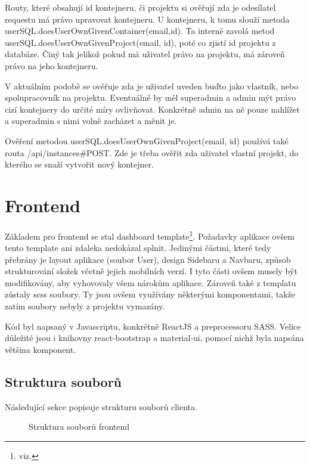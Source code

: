 \documentclass[a4paper,oneside,12pt]{report}
\begin{document}
Routy, které obsahují id kontejneru, či projektu si ověřují zda je odesílatel requestu má právo upravovat kontejneru.
U kontejneru, k tomu slouží metoda userSQL.doesUser\linebreak OwnGivenContainer(email,id).
Ta interně zavolá metod userSQL.doesUserOwnGiven\linebreak Project(email, id), poté co zjistí id projektu z databáze.
Činý tak jelikož pokud má uživatel právo na projektu, má zároveň právo na jeho kontejneru.

V aktuálním podobě se ověřuje zda je uživatel uveden buďto jako vlastník, nebo spolupracovník na projektu.
Eventuálně by měl superadmin a admin mýt právo cizí kontejnery do určité míry ovlivňovat.
Konkrétně admin na ně pouze nahlížet a superadmin s nimi volně zacházet a měnit je.

Ověření metodou userSQL.doesUserOwnGivenProject(email, id) používá také routa /api/instances\#POST.
Zde je třeba ověřit zda uživatel vlastní projekt, do kterého se snaží vytvořit nový kontejner.


\chapter{Frontend}

Základem pro frontend se stal dashboard template\footnote{viz. }.
 Požadavky aplikace ovšem tento template ani zdaleka nedokázal splnit. Jedinými částmi, které tedy přebrány je layout aplikace (soubor User), design Sidebaru a Navbaru, způsob strukturování složek včetně jejich mobilních verzí.
 I tyto části ovšem musely být modifikovány, aby vyhovovaly všem nárokům aplikace.
 Zároveň také z templatu zůstaly scss soubory.
 Ty jsou ovšem využívány některými komponentami, takže zatím soubory nebyly z projektu vymazány.

 Kód byl napsaný v Javascriptu, konkrétně ReactJS a preprocessoru SASS. Velice důležité jsou i knihovny react-bootstrap a material-ui, pomocí nichž byla napsána většina komponent.

\section{Struktura souborů}

Následující sekce popisuje strukturu souborů clienta.

\begin{figure}[h]
	\caption[Struktura souborů frontendu, vlastní tvorba]{Struktura souborů frontend}
	\label{fig:frontendStructure}
\end{figure}
\end{document}

